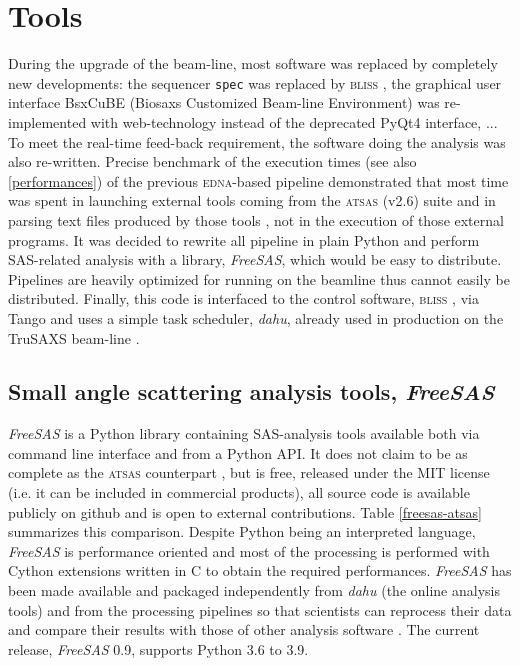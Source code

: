 \documentclass[preprint]{iucr}              %
\begin{document}
\section{Tools}
During the upgrade of the beam-line, most software was replaced by completely new developments: the sequencer \texttt{spec} \cite{spec} was replaced by \textsc{bliss} \cite{bliss}, the graphical user interface BsxCuBE (Biosaxs Customized Beam-line Environment) was re-implemented with web-technology instead of the deprecated PyQt4 interface, ...
To meet the real-time feed-back requirement, the software doing the analysis was also re-written.
Precise benchmark of the execution times (see also \ref{performances}) of the previous \textsc{edna}-based pipeline \cite{BM29ODA} demonstrated that 
most time was spent in launching external tools coming from the \textsc{atsas} (v2.6) suite and in parsing text files produced by those tools , not in the execution of those external programs.
It was decided to rewrite all pipeline in plain Python \cite{python} and perform SAS-related analysis with a library, \textit{FreeSAS}, which would be easy to distribute. 
Pipelines are heavily optimized for running on the beamline thus cannot easily be distributed.
Finally, this code is interfaced to the control software, \textsc{bliss} \cite{bliss}, via Tango \cite{tango} and uses a simple task scheduler, \textit{dahu}, already used in production on the TruSAXS beam-line \cite{id02_2022}.

\subsection{Small angle scattering analysis tools, \textit{FreeSAS}}

\textit{FreeSAS} is a Python library containing SAS-analysis tools available both via command line interface and from a Python API. 
It does not claim to be as complete as the \textsc{atsas} counterpart \cite{ATSAS3},
but is free, released under the MIT license (i.e. it can be included in commercial products), all source code is available publicly on github \cite{freesas} and is open to external contributions.
Table \ref{freesas-atsas} summarizes this comparison.
Despite Python being an interpreted language, \textit{FreeSAS} is performance oriented and most of the processing is performed with Cython \cite{cython} extensions written in C to obtain the required performances. 
\textit{FreeSAS} has been made available and packaged independently from \textit{dahu} (the online analysis tools) and from the processing pipelines so that scientists can reprocess their data and compare their results with those of other analysis software \cite{scatter}. 
The current release, \textit{FreeSAS} 0.9, supports Python 3.6 to 3.9.
\end{document}
